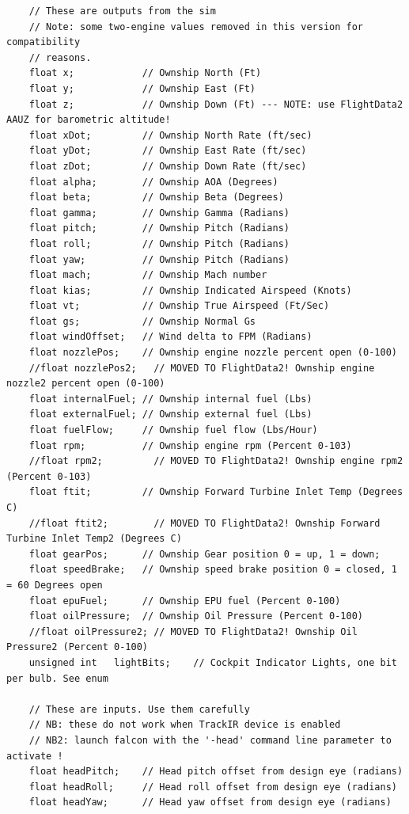 \documentclass[11pt,letterpaper,titlepage]{article}
\begin{document}
\begin{landscape}
\begin{lstlisting}
    // These are outputs from the sim
	// Note: some two-engine values removed in this version for compatibility
	// reasons.
    float x;            // Ownship North (Ft)
    float y;            // Ownship East (Ft)
    float z;            // Ownship Down (Ft) --- NOTE: use FlightData2 AAUZ for barometric altitude!
    float xDot;         // Ownship North Rate (ft/sec)
    float yDot;         // Ownship East Rate (ft/sec)
    float zDot;         // Ownship Down Rate (ft/sec)
    float alpha;        // Ownship AOA (Degrees)
    float beta;         // Ownship Beta (Degrees)
    float gamma;        // Ownship Gamma (Radians)
    float pitch;        // Ownship Pitch (Radians)
    float roll;         // Ownship Pitch (Radians)
    float yaw;          // Ownship Pitch (Radians)
    float mach;         // Ownship Mach number
    float kias;         // Ownship Indicated Airspeed (Knots)
    float vt;           // Ownship True Airspeed (Ft/Sec)
    float gs;           // Ownship Normal Gs
    float windOffset;   // Wind delta to FPM (Radians)
    float nozzlePos;    // Ownship engine nozzle percent open (0-100)
	//float nozzlePos2;   // MOVED TO FlightData2! Ownship engine nozzle2 percent open (0-100) 
    float internalFuel; // Ownship internal fuel (Lbs)
    float externalFuel; // Ownship external fuel (Lbs)
    float fuelFlow;     // Ownship fuel flow (Lbs/Hour)
    float rpm;          // Ownship engine rpm (Percent 0-103)
	//float rpm2;         // MOVED TO FlightData2! Ownship engine rpm2 (Percent 0-103)
    float ftit;         // Ownship Forward Turbine Inlet Temp (Degrees C)
	//float ftit2;        // MOVED TO FlightData2! Ownship Forward Turbine Inlet Temp2 (Degrees C)
    float gearPos;      // Ownship Gear position 0 = up, 1 = down;
    float speedBrake;   // Ownship speed brake position 0 = closed, 1 = 60 Degrees open
    float epuFuel;      // Ownship EPU fuel (Percent 0-100)
    float oilPressure;  // Ownship Oil Pressure (Percent 0-100)
	//float oilPressure2; // MOVED TO FlightData2! Ownship Oil Pressure2 (Percent 0-100)
    unsigned int   lightBits;    // Cockpit Indicator Lights, one bit per bulb. See enum

    // These are inputs. Use them carefully
	// NB: these do not work when TrackIR device is enabled
	// NB2: launch falcon with the '-head' command line parameter to activate !
    float headPitch;    // Head pitch offset from design eye (radians)
    float headRoll;     // Head roll offset from design eye (radians)
    float headYaw;      // Head yaw offset from design eye (radians)


\end{lstlisting}
\end{landscape}
\end{document}
